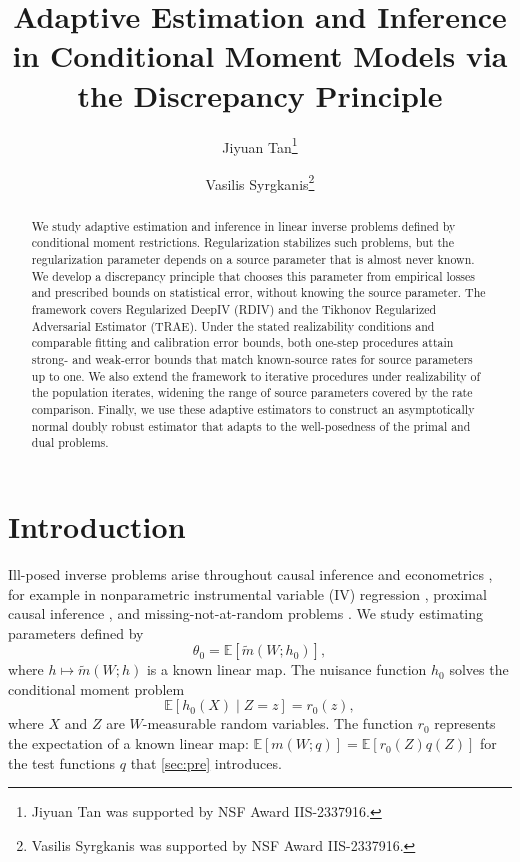\documentclass[12pt]{article}
\title{\LARGE Adaptive Estimation and Inference in Conditional Moment Models via the Discrepancy Principle}
\author{Jiyuan Tan\thanks{Jiyuan Tan was supported by NSF Award IIS-2337916.}\and
Vasilis Syrgkanis\thanks{Vasilis Syrgkanis was supported by NSF Award IIS-2337916.}}
\date{}
\theoremstyle{plain}
\theoremstyle{definition}
\theoremstyle{remark}
\begin{document}
\maketitle


\begin{abstract}
We study adaptive estimation and inference in linear inverse problems defined by conditional moment restrictions. Regularization stabilizes such problems, but the regularization parameter depends on a source parameter that is almost never known. We develop a discrepancy principle that chooses this parameter from empirical losses and prescribed bounds on statistical error, without knowing the source parameter. The framework covers Regularized DeepIV (RDIV) and the Tikhonov Regularized Adversarial Estimator (TRAE). Under the stated realizability conditions and comparable fitting and calibration error bounds, both one-step procedures attain strong- and weak-error bounds that match known-source rates for source parameters up to one. We also extend the framework to iterative procedures under realizability of the population iterates, widening the range of source parameters covered by the rate comparison. Finally, we use these adaptive estimators to construct an asymptotically normal doubly robust estimator that adapts to the well-posedness of the primal and dual problems.

\end{abstract}


\section{Introduction}
Ill-posed inverse problems arise throughout causal inference and econometrics \citep{horowitz2014ill}, for example in nonparametric instrumental variable (IV) regression \citep{neweyInstrumentalVariableEstimation2003,darollesNonparametricInstrumentalRegression2011,neweyNonparametricInstrumentalVariables2013,aiEfficientEstimationModels2003}, proximal causal inference \citep{miao2018confounding,tchetgen2020introduction}, and missing-not-at-random problems \citep{d2010new,miao2015identification,breunig2021nonparametric,li2023non}. We study estimating parameters defined by
\[
\theta _{0} =\mathbb{E}\left[\tilde{m}( W;h_{0})\right] ,
\]
where $h\mapsto\tilde m(W;h)$ is a known linear map. The nuisance function $h_0$ solves the conditional moment problem
\begin{equation}\label{eq:cm}
\mathbb{E}[ h_0(X) \mid Z=z] =r_{0}(z) ,
\end{equation}
where $X$ and $Z$ are $W$-measurable random variables. The function $r_0$ represents the expectation of a known linear map: $\mathbb E[m(W;q)]=\mathbb E[r_0(Z)q(Z)]$ for the test functions $q$ that \cref{sec:pre} introduces.
\end{document}
